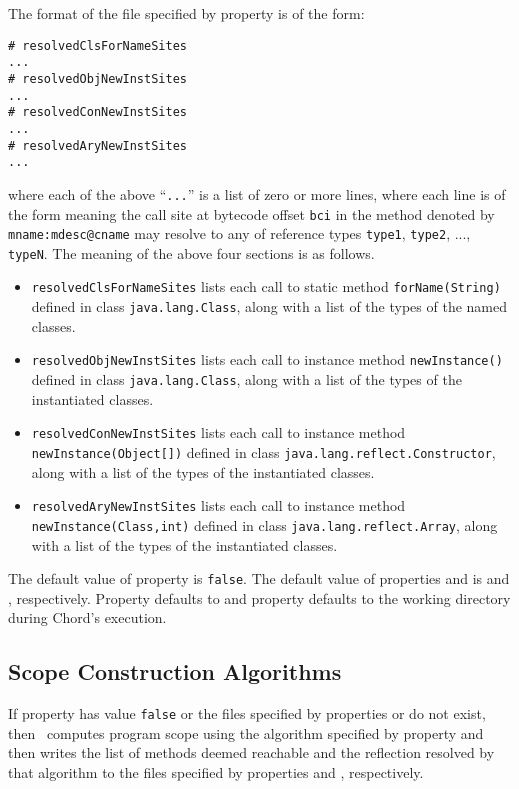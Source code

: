 The format of the file specified by property 
is of the form:
\begin{verbatim}
# resolvedClsForNameSites
...
# resolvedObjNewInstSites
...
# resolvedConNewInstSites
...
# resolvedAryNewInstSites
...
\end{verbatim}
where each of the above ``{\tt ...}'' is a list of zero or more lines, where
each line is of the form
meaning the call site at bytecode offset {\tt bci} in the
method denoted by {\tt mname:mdesc@cname} may resolve to any of
reference types {\tt type1}, {\tt type2}, ..., {\tt typeN}.
The meaning of the above four sections is as follows.
\begin{itemize}
\item {\tt resolvedClsForNameSites} lists
each call to static method {\tt forName(String)} defined in class
{\tt java.lang.Class}, along with a list of the types of the named
classes.
\item {\tt resolvedObjNewInstSites} lists
each call to instance method {\tt newInstance()} defined in class
{\tt java.lang.Class}, along with a list of the types of the
instantiated classes.
\item {\tt resolvedConNewInstSites} lists
each call to instance method {\tt newInstance(Object[])} defined in class
{\tt java.lang.reflect.Constructor}, along with a list of the types of the
instantiated classes.
\item {\tt resolvedAryNewInstSites} lists
each call to instance method {\tt newInstance(Class,int)} defined in class
{\tt java.lang.reflect.Array}, along with a list of the types of the
instantiated classes.
\end{itemize}
The default value of property  is {\tt false}.
The default value of properties  and
 is  and
, respectively.
Property  defaults to
 and property
 defaults to the working directory during Chord's
execution.

\subsection{Scope Construction Algorithms}

If property  has value {\tt false} or the
files specified by properties  or
 do not exist, then \Chord\ computes program
scope using the algorithm specified by property
 and then writes the list of methods deemed
reachable and the reflection resolved by that algorithm to the files
specified by properties  and
, respectively.

